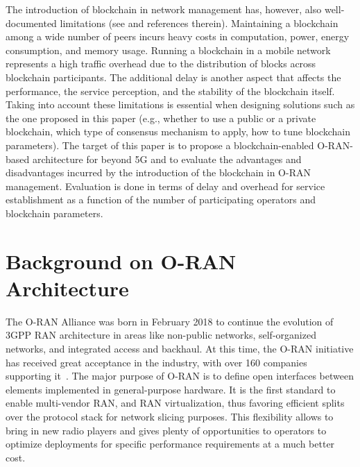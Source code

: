 \documentclass[journal]{IEEEtran}
\begin{document}
	The introduction of blockchain in network management has, however, also well-documented limitations (see \cite{FWilhelmi_PIMRC} and references therein). Maintaining a blockchain among a wide number of peers incurs heavy costs in computation, power, energy consumption, and memory usage. Running a blockchain in a mobile network represents a high traffic overhead due to the distribution of blocks across blockchain participants. The additional delay is another aspect that affects the performance, the service perception, and the stability of the blockchain itself. Taking into account these limitations is essential when designing solutions such as the one proposed in this paper (e.g., whether to use a public or a private blockchain, which type of consensus mechanism to apply, how to tune blockchain parameters). The target of this paper is to propose a blockchain-enabled O-RAN-based architecture for beyond 5G and to evaluate the advantages and disadvantages incurred by the introduction of the blockchain in O-RAN management. Evaluation is done in terms of delay and overhead for service establishment as a function of the number of participating operators and blockchain parameters.
	
	\section{Background on O-RAN Architecture}
	\label{section:oran}
	The O-RAN Alliance was born in February 2018 to continue the evolution of 3GPP RAN architecture in areas like non-public networks, self-organized networks, and integrated access and backhaul. At this time, the O-RAN initiative has received great acceptance in the industry, with over 160 companies supporting it~\cite{garcia2021ran}. The major purpose of O-RAN is to define open interfaces between elements implemented in general-purpose hardware. It is the first standard to enable multi-vendor RAN, and RAN virtualization, thus favoring efficient splits over the protocol stack for network slicing purposes. This flexibility allows to bring in new radio players and gives plenty of opportunities to operators to optimize deployments for specific performance requirements at a much better cost. 
	
\end{document}
